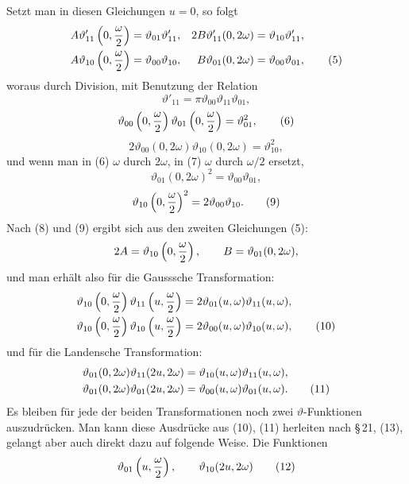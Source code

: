 \documentclass[11pt]{article}
\providecommand{\tht}{\vartheta}
\begin{document}
Setzt man in diesen Gleichungen $u=0$, so folgt
\begin{align}
A\tht'_{11}\left(0,{\omega\over2}\right)&=\tht_{01}\tht'_{11},&
2B\tht'_{11}(0,2\omega)&=\tht_{10}\tht'_{11},\notag\\
A\tht_{10}\left(0,{\omega\over2}\right)&=\tht_{00}\tht_{10},&
B\tht_{01}(0,2\omega)&=\tht_{00}\tht_{01}, \tag{5}
\end{align}
woraus durch Division, mit Benutzung der Relation
\[
\tht'_{11}=\pi\tht_{00}\tht_{11}\tht_{01},
\]
\begin{equation}
\tht_{00}\left(0,{\omega\over2}\right)\tht_{01}\left(0,{\omega\over2}\right)=\tht_{01}^2, \tag{6}
\end{equation}
\begin{equation}
2\tht_{00}(0,2\omega)\tht_{10}(0,2\omega)=\tht_{10}^2, \tag{7}
\end{equation}
und wenn man in (6) $\omega$ durch $2\omega$, in (7) $\omega$ durch $\omega/2$ ersetzt,
\begin{equation}
\tht_{01}(0,2\omega)^2=\tht_{00}\tht_{01}, \tag{8}
\end{equation}
\begin{equation}
\tht_{10}\left(0,{\omega\over2}\right)^2=2\tht_{00}\tht_{10}. \tag{9}
\end{equation}
Nach (8) und (9) ergibt sich aus den zweiten Gleichungen (5):
\[
2A=\tht_{10}\left(0,{\omega\over2}\right),\qquad B=\tht_{01}(0,2\omega),
\]
und man erhält also für die Gausssche Transformation:
\begin{align}
\tht_{10}\left(0,{\omega\over2}\right)\tht_{11}\left(u,{\omega\over2}\right)&=2\tht_{01}(u,\omega)\tht_{11}(u,\omega),\notag\\
\tht_{10}\left(0,{\omega\over2}\right)\tht_{10}\left(u,{\omega\over2}\right)&=2\tht_{00}(u,\omega)\tht_{10}(u,\omega), \tag{10}
\end{align}
und für die Landensche Transformation:
\begin{align}
\tht_{01}(0,2\omega)\tht_{11}(2u,2\omega)&=\tht_{10}(u,\omega)\tht_{11}(u,\omega),\notag\\
\tht_{01}(0,2\omega)\tht_{01}(2u,2\omega)&=\tht_{00}(u,\omega)\tht_{01}(u,\omega). \tag{11}
\end{align}
Es bleiben für jede der beiden Transformationen noch zwei $\vartheta$-Funktionen auszudrücken. Man kann diese Ausdrücke aus (10), (11) herleiten nach \S\,21, (13), gelangt aber auch direkt dazu auf folgende Weise. Die Funktionen
\begin{equation}
\tht_{01}\left(u,{\omega\over2}\right),\qquad \tht_{10}(2u,2\omega) \tag{12}
\end{equation}
\end{document}
